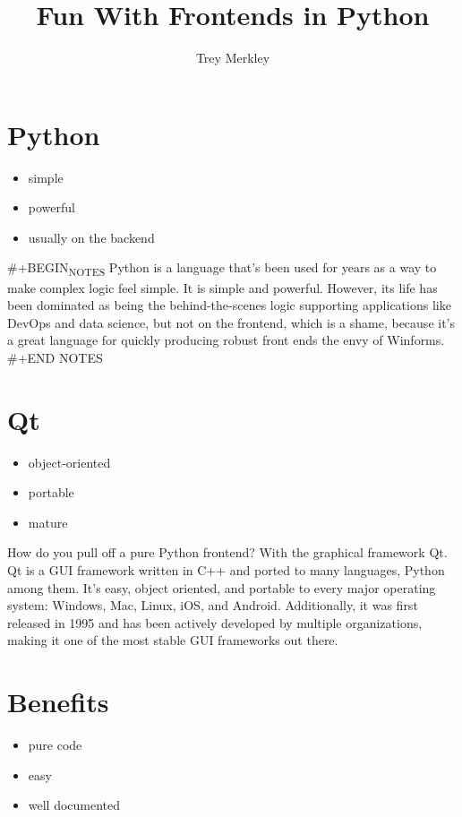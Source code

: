\documentclass[11pt]{article}
\author{Trey Merkley}
\date{}
\title{Fun With Frontends in Python}
\begin{document}
\maketitle
\tableofcontents

\section{Python}
\label{sec:orge3b45a9}
\begin{itemize}
\item simple
\item powerful
\item usually on the backend
\end{itemize}

\#+BEGIN\textsubscript{NOTES}
Python is a language that's been used for years as a way to make complex logic feel simple. It is simple and powerful. However, its life has been dominated as being the behind-the-scenes logic supporting applications like DevOps and data science, but not on the frontend, which is a shame, because it's a great language for quickly producing robust front ends the envy of Winforms.
\#+END NOTES

\section{Qt}
\label{sec:org9633a5f}
\begin{itemize}
\item object-oriented
\item portable
\item mature
\end{itemize}

\begin{notes}
How do you pull off a pure Python frontend? With the graphical framework Qt. Qt is a GUI framework written in C++ and ported to many languages, Python among them. It's easy, object oriented, and portable to every major operating system: Windows, Mac, Linux, iOS, and Android. Additionally, it was first released in 1995 and has been actively developed by multiple organizations, making it one of the most stable GUI frameworks out there.
\end{notes}

\section{Benefits}
\label{sec:orgec5ce84}
\begin{itemize}
\item pure code
\item easy
\item well documented
\end{itemize}
\end{document}
